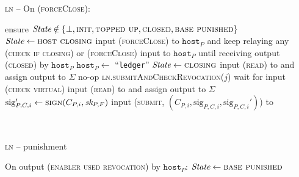 \begin{center}
  \begin{processbox}{\textsc{ln} -- On (\textsc{forceClose}):}
    \ \\
    \begin{algorithmic}[1]
      \State ensure $\itistate \notin \{\bot, \textsc{init}, \textsc{topped up},
      \textsc{closed}, \textsc{base punished}\}$ 
       
        \State $\itistate \gets \textsc{host closing}$
        \State input (\textsc{forceClose}) to $\texttt{host}_P$ and keep relaying any
        (\textsc{check if closing}) or (\textsc{forceClose}) input to
        $\texttt{host}_P$ until receiving output (\textsc{closed}) by
        $\texttt{host}_P$
        \label{code:ln:close:relay}
        \State $\texttt{host}_P \gets$ ``\texttt{ledger}''
      \EndIf
      \State $\itistate \gets \textsc{closing}$
      \State input (\textsc{read}) to \ledger and assign output to $\Sigma$
       
        \State no-op 
        \State \textsc{ln}.\textsc{submitAndCheckRevocation}($j$)
      \Else \: 
         
          \State wait for input (\textsc{check virtual}) 
          \State input (\textsc{read}) to \ledger and assign output to $\Sigma$
        \EndWhile
        \State $\mathrm{sig}_{P, C, i}' \gets \textsc{sign}(C_{P, i}, \textit{sk}_{P,
        F})$
        \State input (\textsc{submit}, $(C_{P, i}, \mathrm{sig}_{P, C, i},
        \mathrm{sig}_{P, C, i}')$) to \ledger
        \label{code:ln:close:submit}
      \EndIf
    \end{algorithmic}
  \end{processbox}
  \label{code:ln:close}
\end{center} \ \\

\begin{center}
  \begin{processbox}{\textsc{ln} -- punishment}
    \ \\
    \begin{algorithmic}[1]
      \State On output (\textsc{enabler used revocation}) by $\texttt{host}_P$:
      \Indent
        \State $\itistate \gets \textsc{base punished}$
      \EndIndent
    \end{algorithmic}
  \end{processbox}
  \label{code:ln:used-revocation}
\end{center} \ \\

